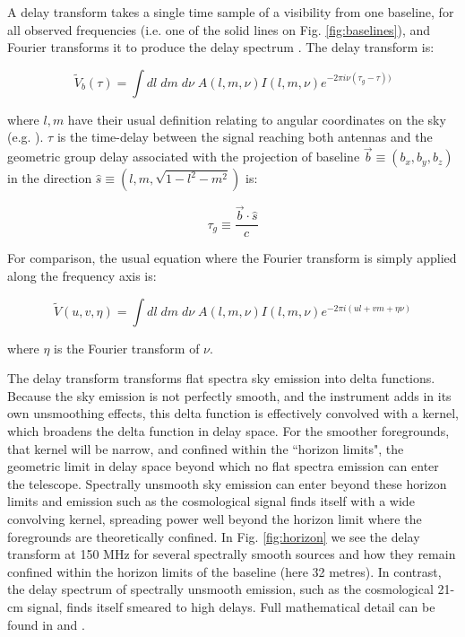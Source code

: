 A delay transform takes a single time sample of a visibility from one baseline, for all observed frequencies (i.e. one of the solid lines on Fig. \ref{fig:baselines}), and Fourier transforms it to produce the delay spectrum \citep{Parsons2012ApJ...756..165P,Parsons2012ApJ...753...81P,Parsons2009AJ....138..219P}. The delay transform is:

\begin{equation}
    \widetilde{V}_b(\tau) = \int dl \; dm \; d\nu \; A(l,m,\nu)I(l,m,\nu)e^{-2\pi i\nu(\tau_g-\tau))}
\end{equation}

\noindent where $l,m$ have their usual definition relating to angular coordinates on the sky (e.g. \citet{Thompson2001isra.book.....T}). $\tau$ is the time-delay between the signal reaching both antennas and the geometric group delay associated with the projection of baseline $\overrightarrow{b} \equiv (b_x,b_y,b_z) $ in the direction $ \hat{s} \equiv (l,m,\sqrt{1-l^2-m^2})$ is:

\begin{equation}
    \tau_g \equiv \frac{\overrightarrow{b} \cdot \hat{s}}{c} 
\end{equation}

For comparison, the usual equation where the Fourier transform is simply applied along the frequency axis is:

\begin{equation}
    \widetilde{V}(u,v,\eta) = \int dl \; dm \; d\nu \; A(l,m,\nu)I(l,m,\nu)e^{-2\pi i(ul+vm+\eta\nu)}
\end{equation}

\noindent where $\eta$ is the Fourier transform of $\nu$.

The delay transform transforms flat spectra sky emission into delta functions. Because the sky emission is not perfectly smooth, and the instrument adds in its own unsmoothing effects, this delta function is effectively convolved with a kernel, which broadens the delta function in delay space. For the smoother foregrounds, that kernel will be narrow, and confined within the ``horizon limits", the geometric limit in delay space beyond which no flat spectra emission can enter the telescope. Spectrally unsmooth sky emission can enter beyond these horizon limits and emission such as the cosmological signal finds itself with a wide convolving kernel, spreading power well beyond the horizon limit where the foregrounds are theoretically confined. In Fig. \ref{fig:horizon} we see the delay transform at 150 MHz for several spectrally smooth sources and how they remain confined within the horizon limits of the baseline (here 32 metres). In contrast, the delay spectrum of spectrally unsmooth emission, such as the cosmological 21-cm signal, finds itself smeared to high delays. Full mathematical detail can be found in \citet{Parsons2012ApJ...756..165P,Parsons2012ApJ...753...81P} and \citet{Parsons2009AJ....138..219P}.

